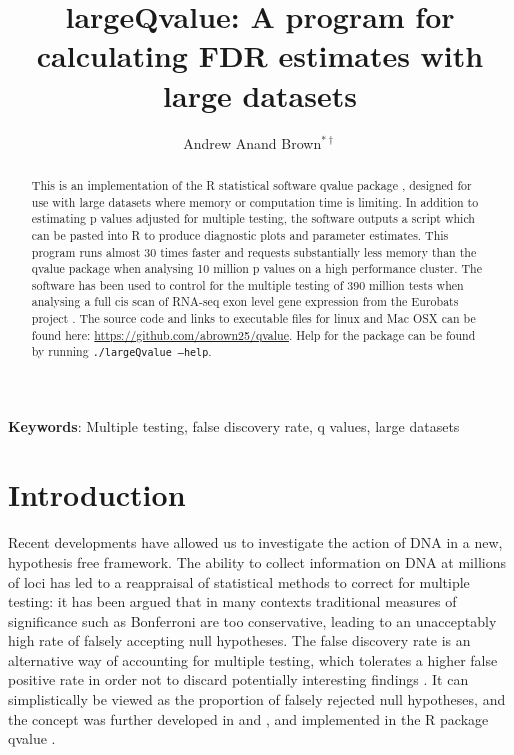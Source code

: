 \documentclass{amsart}
\author[]{Andrew Anand Brown$^{*\dagger}$}
\title[largeQvalue]{largeQvalue: A program for calculating FDR estimates with large datasets}
\begin{document}
\maketitle

\linespread{1.6}

\begin{abstract}
This is an implementation of the R statistical software qvalue package \citep{qvalue}, designed for use with large datasets where memory or computation time is limiting. In addition to estimating p values adjusted for multiple testing, the software outputs a script which can be pasted into R to produce diagnostic plots and parameter estimates. This program runs almost 30 times faster and requests substantially less memory than the qvalue package when analysing 10 million p values on a high performance cluster. The software has been used to control for the multiple testing of 390 million tests when analysing a full cis scan of RNA-seq exon level gene expression from the Eurobats project \citep{brownepistasis}. The source code and links to executable files for linux and Mac OSX can be found here: \url{https://github.com/abrown25/qvalue}. Help for the package can be found by running \texttt{./largeQvalue --help}. 
\end{abstract}

\bigskip

\noindent \small{\textbf{Keywords}: Multiple testing, false discovery rate, q values, large datasets}

\bigskip

\section{Introduction}

Recent developments have allowed us to investigate the action of DNA in a new, hypothesis free framework. The ability to collect information on DNA at millions of loci has led to a reappraisal of statistical methods to correct for multiple testing: it has been argued that in many contexts traditional measures of significance such as Bonferroni are too conservative, leading to an unacceptably high rate of falsely accepting null hypotheses. The false discovery rate is an alternative way of accounting for multiple testing, which tolerates a higher false positive rate in order not to discard potentially interesting findings \citep{fdr}. It can simplistically be viewed as the proportion of falsely rejected null hypotheses, and the concept was further developed in \citet{splinestorey} and \citet{bootstorey}, and implemented in the R package qvalue \citep{qvalue}.
\end{document}
